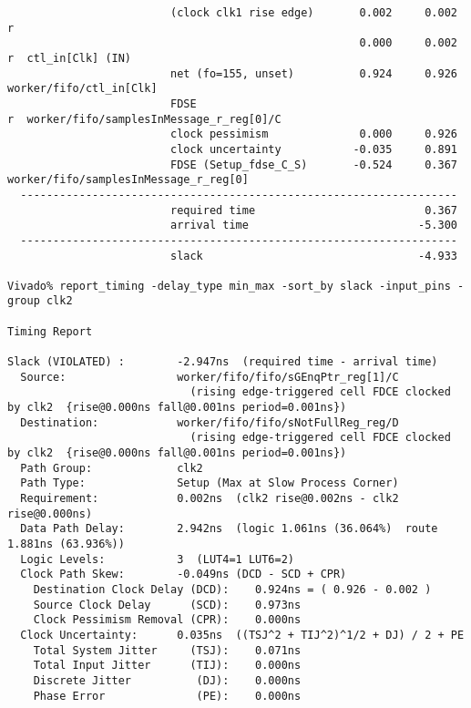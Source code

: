 \documentclass{article}
\begin{document}
\begin{lstlisting}
                         (clock clk1 rise edge)       0.002     0.002 r
                                                      0.000     0.002 r  ctl_in[Clk] (IN)
                         net (fo=155, unset)          0.924     0.926    worker/fifo/ctl_in[Clk]
                         FDSE                                         r  worker/fifo/samplesInMessage_r_reg[0]/C
                         clock pessimism              0.000     0.926
                         clock uncertainty           -0.035     0.891
                         FDSE (Setup_fdse_C_S)       -0.524     0.367    worker/fifo/samplesInMessage_r_reg[0]
  -------------------------------------------------------------------
                         required time                          0.367
                         arrival time                          -5.300
  -------------------------------------------------------------------
                         slack                                 -4.933

Vivado% report_timing -delay_type min_max -sort_by slack -input_pins -group clk2

Timing Report

Slack (VIOLATED) :        -2.947ns  (required time - arrival time)
  Source:                 worker/fifo/fifo/sGEnqPtr_reg[1]/C
                            (rising edge-triggered cell FDCE clocked by clk2  {rise@0.000ns fall@0.001ns period=0.001ns})
  Destination:            worker/fifo/fifo/sNotFullReg_reg/D
                            (rising edge-triggered cell FDCE clocked by clk2  {rise@0.000ns fall@0.001ns period=0.001ns})
  Path Group:             clk2
  Path Type:              Setup (Max at Slow Process Corner)
  Requirement:            0.002ns  (clk2 rise@0.002ns - clk2 rise@0.000ns)
  Data Path Delay:        2.942ns  (logic 1.061ns (36.064%)  route 1.881ns (63.936%))
  Logic Levels:           3  (LUT4=1 LUT6=2)
  Clock Path Skew:        -0.049ns (DCD - SCD + CPR)
    Destination Clock Delay (DCD):    0.924ns = ( 0.926 - 0.002 )
    Source Clock Delay      (SCD):    0.973ns
    Clock Pessimism Removal (CPR):    0.000ns
  Clock Uncertainty:      0.035ns  ((TSJ^2 + TIJ^2)^1/2 + DJ) / 2 + PE
    Total System Jitter     (TSJ):    0.071ns
    Total Input Jitter      (TIJ):    0.000ns
    Discrete Jitter          (DJ):    0.000ns
    Phase Error              (PE):    0.000ns


\end{lstlisting}
\end{document}
